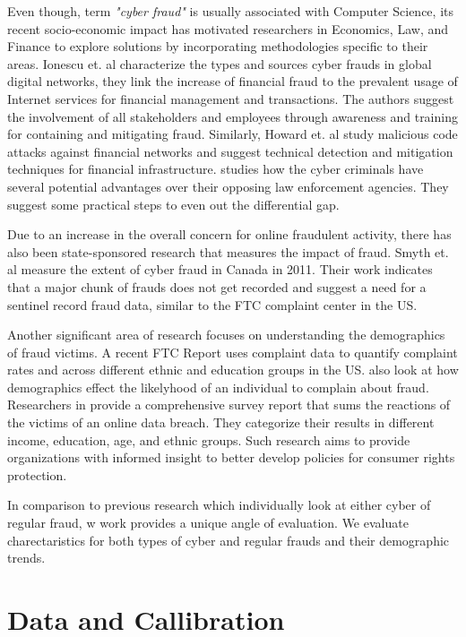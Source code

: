 \documentclass[conference]{IEEEtran}
\begin{document}
Even though, term \emph{"cyber fraud"} is usually associated with Computer Science, its recent socio-economic impact has motivated researchers in Economics, Law, and Finance to explore solutions by incorporating methodologies specific to their areas. Ionescu et. al \cite{fraudfinance} characterize the types and sources cyber frauds in global digital networks, they link the increase of financial fraud to the prevalent usage of Internet services for financial management and transactions. The authors suggest the involvement of all stakeholders and employees through awareness and training for containing and mitigating fraud. Similarly, Howard et. al \cite{cybertrends} study malicious code attacks against financial networks and suggest technical detection and mitigation techniques for financial infrastructure. \cite{playingfield} studies how the cyber criminals have several potential advantages over their opposing law enforcement agencies. They suggest some practical steps to even out the differential gap.

Due to an increase in the overall concern for online fraudulent activity, there has also been state-sponsored research that measures the impact of fraud. Smyth et. al \cite{fraudcanada} measure the extent of cyber fraud in Canada in 2011. Their work indicates that a major chunk of frauds does not get recorded and suggest a need for a sentinel record fraud data, similar to the FTC complaint center in the US.

Another significant area of research focuses on understanding the demographics of fraud victims. A recent FTC Report \cite{ftccomplaints} uses complaint data to quantify complaint rates and across different ethnic and education groups in the US. \cite{consurmeraffairs} also look at how demographics effect the likelyhood of an individual to complain about fraud. Researchers in \cite{databreach} provide a comprehensive survey report that sums the reactions of the victims of an online data breach. They categorize their results in different income, education, age, and ethnic groups. Such research aims to provide organizations with informed insight to better develop policies for consumer rights protection.

In comparison to previous research which individually look at either cyber of regular fraud, w work provides a unique angle of evaluation. We evaluate charectaristics for both types of cyber and regular frauds and their demographic trends.

\section{Data and Callibration} \label{data-cal}
\end{document}
